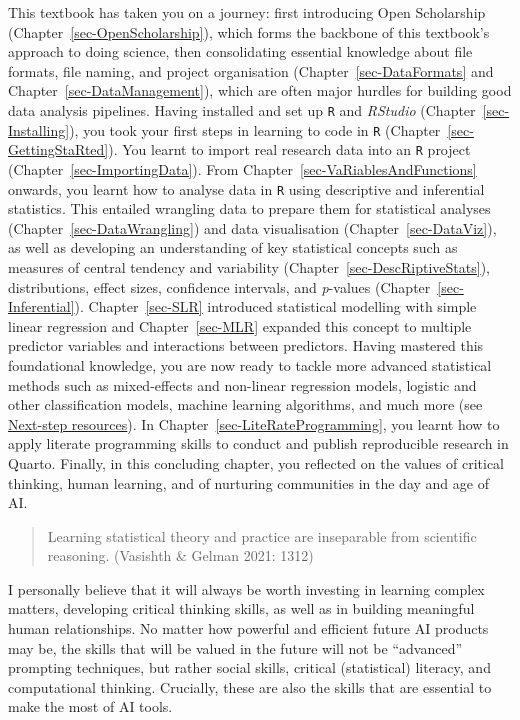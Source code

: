 \documentclass[
  letterpaper,
  DIV=11,
  numbers=noendperiod]{scrreprt}
\begin{document}
This textbook has taken you on a journey: first introducing Open
Scholarship (Chapter~\ref{sec-OpenScholarship}), which forms the
backbone of this textbook's approach to doing science, then
consolidating essential knowledge about file formats, file naming, and
project organisation (Chapter~\ref{sec-DataFormats} and
Chapter~\ref{sec-DataManagement}), which are often major hurdles for
building good data analysis pipelines. Having installed and set up
\texttt{R} and \emph{RStudio} (Chapter~\ref{sec-Installing}), you took
your first steps in learning to code in \texttt{R}
(Chapter~\ref{sec-GettingStaRted}). You learnt to import real research
data into an \texttt{R} project (Chapter~\ref{sec-ImportingData}). From
Chapter~\ref{sec-VaRiablesAndFunctions} onwards, you learnt how to
analyse data in \texttt{R} using descriptive and inferential statistics.
This entailed wrangling data to prepare them for statistical analyses
(Chapter~\ref{sec-DataWrangling}) and data visualisation
(Chapter~\ref{sec-DataViz}), as well as developing an understanding of
key statistical concepts such as measures of central tendency and
variability (Chapter~\ref{sec-DescRiptiveStats}), distributions, effect
sizes, confidence intervals, and \emph{p}-values
(Chapter~\ref{sec-Inferential}). Chapter~\ref{sec-SLR} introduced
statistical modelling with simple linear regression and
Chapter~\ref{sec-MLR} expanded this concept to multiple predictor
variables and interactions between predictors. Having mastered this
foundational knowledge, you are now ready to tackle more advanced
statistical methods such as mixed-effects and non-linear regression
models, logistic and other classification models, machine learning
algorithms, and much more (see
\href{https://elenlefoll.github.io/RstatsTextbook/A_FurtherResources.html}{Next-step
resources}). In Chapter~\ref{sec-LiteRateProgramming}, you learnt how to
apply literate programming skills to conduct and publish reproducible
research in Quarto. Finally, in this concluding chapter, you reflected
on the values of critical thinking, human learning, and of nurturing
communities in the day and age of AI.

\begin{quote}
Learning statistical theory and practice are inseparable from scientific
reasoning. (Vasishth \& Gelman 2021: 1312)
\end{quote}

I personally believe that it will always be worth investing in learning
complex matters, developing critical thinking skills, as well as in
building meaningful human relationships. No matter how powerful and
efficient future AI products may be, the skills that will be valued in
the future will not be ``advanced'' prompting techniques, but rather
social skills, critical (statistical) literacy, and computational
thinking. Crucially, these are also the skills that are essential to
make the most of AI tools.
\end{document}
